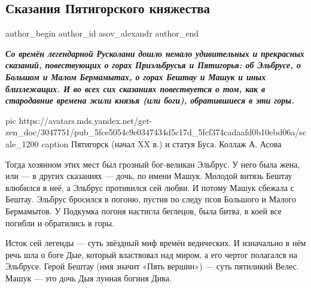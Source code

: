  
 
 
 
 
 
\subsection{Сказания Пятигорского княжества}
\label{sec:17_12_2020.sites.ru.zen_yandex.asov_alexandr.1.skazanija_pjatigorskogo_knjazhestva}
\ifcmt
	author_begin
   author_id asov_alexandr
	author_end
\fi


\begin{leftbar}
  \begingroup
    \em\Large\bfseries\color{blue}
Со времён легендарной Русколани дошло немало удивительных и прекрасных
сказаний, повествующих о горах Приэльбрусья и Пятигорья: об Эльбрусе, о Большом
и Малом Бермамытах, о горах Бештау и Машук и иных близлежащих. И во всех сих
сказаниях повествуется о том, как в стародавние времена жили князья (или боги),
обратившиеся в эти горы.
  \endgroup
\end{leftbar}


\ifcmt
  pic https://avatars.mds.yandex.net/get-zen_doc/3047751/pub_5fce5054c9e0347434d5c17d_5fcf374cadaafd0b10ebd06a/scale_1200
	caption Пятигорск (начал XX в.) и статуя Буса. Коллаж А. Асова
\fi

Тогда хозяином этих мест был грозный бог-великан Эльбрус. У него была жена, или
— в других сказаниях — дочь, по имени Машук. Молодой витязь Бештау влюбился в
неё, а Эльбрус противился сей любви. И потому Машук сбежала с Бештау. Эльбрус
бросился в погоню, пустив по следу псов Большого и Малого Бермамытов. У
Подкумка погоня настигла беглецов, была битва, в коей все погибли и обратились
в горы.

Исток сей легенды — суть звёздный миф времён ведических. И изначально в нём
речь шла о боге Дые, который властвовал над миром, а его чертог полагался на
Эльбрусе. Герой Бештау (имя значит «Пять вершин») — суть пятиликий Велес. Машук
— это дочь Дыя лунная богиня Дива.

